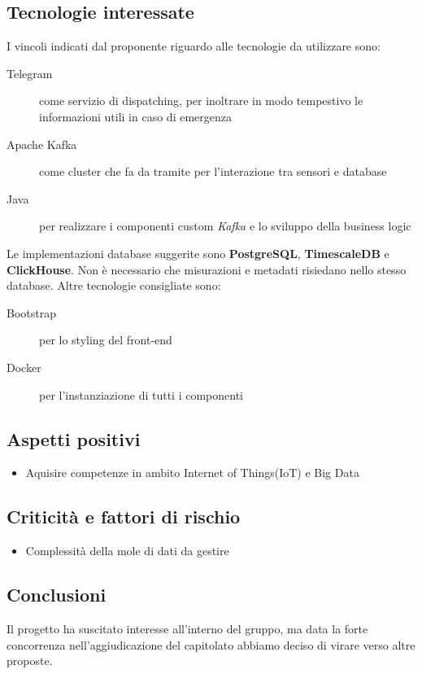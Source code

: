 \documentclass[../studio-di-fattibilita.tex]{subfiles}
\begin{document}
	\subsection{Tecnologie interessate}
	\label{sec:tecnologie_interessate}
	I vincoli indicati dal proponente riguardo alle tecnologie da utilizzare sono:
	\begin{description}
		\item[Telegram] come servizio di dispatching, per inoltrare in modo tempestivo le informazioni utili in caso di emergenza
		\item[Apache Kafka] come cluster che fa da tramite per l'interazione tra sensori e database
		\item[Java] per realizzare i componenti custom \textit{Kafka} e lo sviluppo della business logic
	\end{description}
	Le implementazioni database suggerite sono \textbf{PostgreSQL}, \textbf{TimescaleDB} e \textbf{ClickHouse}.
	Non è necessario che misurazioni e metadati risiedano nello stesso database.
	Altre tecnologie consigliate sono:
	\begin{description}
		\item[Bootstrap] per lo styling del front-end
		\item[Docker] per l'instanziazione di tutti i componenti
	\end{description}
	\subsection{Aspetti positivi}
	\label{sec:aspetti_positivi}
	\begin{itemize}
		\item Aquisire competenze in ambito Internet of Things(IoT) e Big Data
	\end{itemize}
	\subsection{Criticità e fattori di rischio}
	\label{sec:criticità_e_fattori_di_rischio}
	\begin{itemize}
		\item Complessità della mole di dati da gestire
	\end{itemize}
	\subsection{Conclusioni}
	\label{sec:conclusioni}
	Il progetto ha suscitato interesse all'interno del gruppo, ma data la forte concorrenza nell'aggiudicazione del capitolato abbiamo deciso di virare verso altre proposte.
\end{document}
